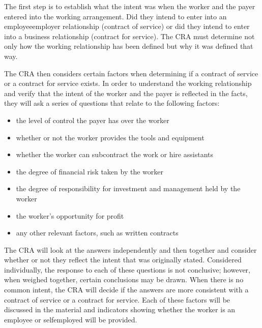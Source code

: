 \documentclass[letterpaper,10pt,english]{sphinxmanual}
\begin{document}
\sphinxAtStartPar
{}
The first step is to establish what the intent was when the worker and the payer entered into
the working arrangement. Did they intend to enter into an employee\sphinxhyphen{}employer relationship
(contract of service) or did they intend to enter into a business relationship (contract for
service). The CRA must determine not only how the working relationship has been defined
but why it was defined that way.

\sphinxAtStartPar
{}
The CRA then considers certain factors when determining if a contract of service or a
contract for service exists. In order to understand the working relationship and verify that the
intent of the worker and the payer is reflected in the facts, they will ask a series of questions
that relate to the following factors:
\begin{itemize}
\item {} 
\sphinxAtStartPar
the level of control the payer has over the worker

\item {} 
\sphinxAtStartPar
whether or not the worker provides the tools and equipment

\item {} 
\sphinxAtStartPar
whether the worker can subcontract the work or hire assistants

\item {} 
\sphinxAtStartPar
the degree of financial risk taken by the worker

\item {} 
\sphinxAtStartPar
the degree of responsibility for investment and management held by the worker

\item {} 
\sphinxAtStartPar
the worker’s opportunity for profit

\item {} 
\sphinxAtStartPar
any other relevant factors, such as written contracts

\end{itemize}

\sphinxAtStartPar
The CRA will look at the answers independently and then together and consider whether or
not they reflect the intent that was originally stated. Considered individually, the response to
each of these questions is not conclusive; however, when weighed together, certain
conclusions may be drawn. When there is no common intent, the CRA will decide if the
answers are more consistent with a contract of service or a contract for service.
Each of these factors will be discussed in the material and indicators showing whether the
worker is an employee or self\sphinxhyphen{}employed will be provided.
\end{document}
